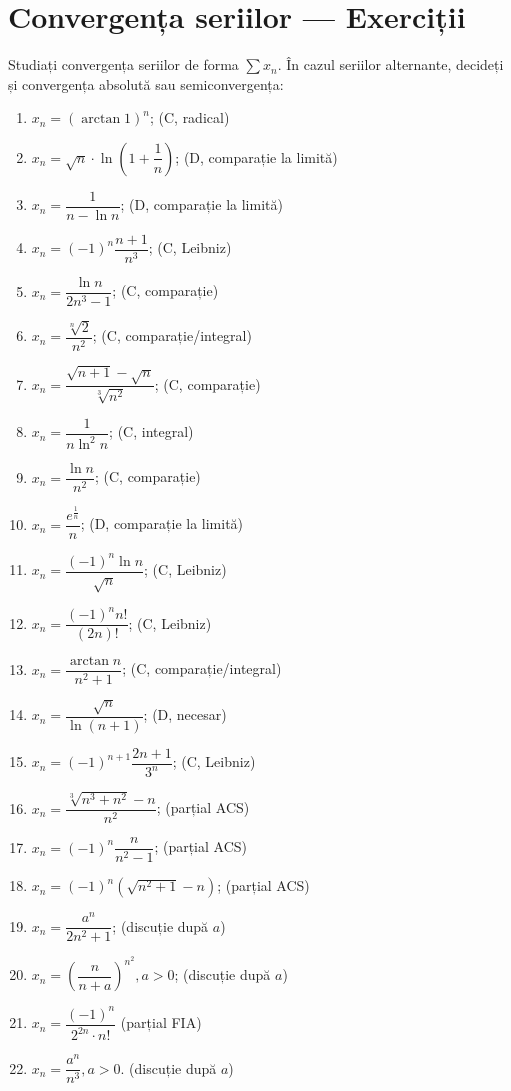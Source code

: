 \chapter{Convergența seriilor --- Exerciții}

Studiați convergența seriilor de forma $ \sum x_n $. În cazul
seriilor alternante, decideți și convergența absolută sau semiconvergența:
\begin{enumerate}[(1)]
    \item $ x_n = (\arctan 1)^n $; \hfill(C, radical)
    \item $ x_n = \sqrt{n} \cdot \ln \left( 1 + \dfrac{1}{n} \right) $; \hfill(D, comparație la limită)
    \item $ x_n = \dfrac{1}{n - \ln n} $; \hfill(D, comparație la limită)
    \item $ x_n = (-1)^n \dfrac{n + 1}{n^3} $; \hfill(C, Leibniz)
    \item $ x_n = \dfrac{\ln n}{2n^3 - 1} $; \hfill(C, comparație)
    \item $ x_n = \dfrac{\sqrt[n]{2}}{n^2} $; \hfill(C, comparație/integral)
    \item $ x_n = \dfrac{\sqrt{n + 1} - \sqrt{n}}{\sqrt[3]{n^2}} $; \hfill(C, comparație)
    \item $ x_n = \dfrac{1}{n \ln^2 n} $; \hfill(C, integral)
    \item $ x_n = \dfrac{\ln n}{n^2} $; \hfill(C, comparație)
    \item $ x_n = \dfrac{e^\frac{1}{n}}{n} $; \hfill(D, comparație la limită)
    \item $ x_n = \dfrac{(-1)^n \ln n}{\sqrt{n}} $; \hfill(C, Leibniz)
    \item $ x_n = \dfrac{(-1)^n n!}{(2n)!} $; \hfill(C, Leibniz)
    \item $ x_n = \dfrac{\arctan n}{n^2 + 1} $; \hfill(C, comparație/integral)
    \item $ x_n = \dfrac{\sqrt{n}}{\ln(n + 1)} $; \hfill(D, necesar)
    \item $ x_n = (-1)^{n+1} \dfrac{2n + 1}{3^n} $; \hfill(C, Leibniz)
    \item $ x_n = \dfrac{\sqrt[3]{n^3 + n^2} - n}{n^2} $; \hfill(parțial ACS)
    \item $ x_n = (-1)^n \dfrac{n}{n^2 - 1} $; \hfill(parțial ACS)
    \item $ x_n = (-1)^n (\sqrt{n^2 + 1} - n) $; \hfill(parțial ACS)
    \item $ x_n = \dfrac{a^n}{2n^2 + 1} $; \hfill(discuție după $ a $)
    \item $ x_n = \left( \dfrac{n}{n + a} \right)^{n^2}, a > 0 $; \hfill(discuție după $ a $)
    \item $ x_n = \dfrac{(-1)^n}{2^{2n} \cdot n!} $ \hfill(parțial FIA)
    \item $ x_n = \dfrac{a^n}{n^3}, a > 0 $. \hfill(discuție după $ a $)
\end{enumerate}

